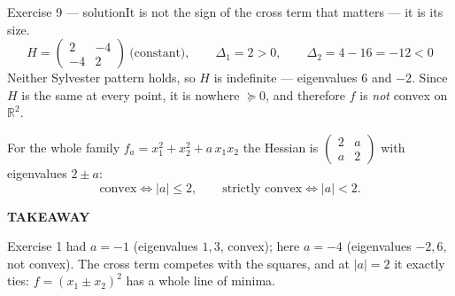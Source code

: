 \documentclass[aspectratio=169,11pt]{beamer}
\newcommand{\kicker}[1]{{\color{hseaccent}\scriptsize\bfseries\MakeUppercase{#1}}}
\newcommand{\takeaway}[2]{%
  \par\smallskip\noindent
  \colorbox{hselight}{\parbox{\dimexpr\textwidth-2\fboxsep}{%
    \kicker{#1}\par\vspace{0.12em}\footnotesize #2}}\par}
\begin{document}
\begin{frame}{Exercise 9 --- solution}{It is not the sign of the cross term that matters --- it is its size.}
  \vspace{0.3em}
  \[ H=\begin{pmatrix}2&-4\\-4&2\end{pmatrix}\ \text{(constant)},\qquad
    \Delta_1=2>0,\qquad \Delta_2=4-16=-12<0 \]
  {\small Neither Sylvester pattern holds, so $H$ is indefinite --- eigenvalues $6$ and $-2$. Since $H$ is the
    same at every point, it is nowhere $\succeq0$, and therefore $f$ is \emph{not} convex on $\mathbb{R}^2$.}
  \par\medskip
  For the whole family $f_a=x_1^{2}+x_2^{2}+a\,x_1x_2$ the Hessian is
  $\left(\begin{smallmatrix}2&a\\a&2\end{smallmatrix}\right)$ with eigenvalues $2\pm a$:
  \[ \text{convex}\iff|a|\le2,\qquad \text{strictly convex}\iff|a|<2. \]
  \takeaway{takeaway}{Exercise 1 had $a=-1$ (eigenvalues $1,3$, convex); here $a=-4$ (eigenvalues $-2,6$, not
    convex). The cross term competes with the squares, and at $|a|=2$ it exactly ties: $f=(x_1\pm x_2)^2$ has a
    whole line of minima.}
\end{frame}
\end{document}

